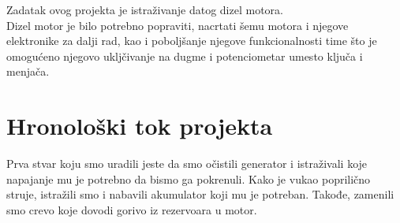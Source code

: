 \documentclass[a4paper, 11pt, titlepage]{article}
\begin{document}
Zadatak ovog projekta je istraživanje datog dizel motora. \\
Dizel motor je bilo potrebno popraviti, nacrtati šemu motora i njegove elektronike za dalji rad, kao i poboljšanje njegove funkcionalnosti time što je omogućeno njegovo ukljčivanje na dugme i potenciometar umesto ključa i menjača.



\newpage
\section{Hronološki tok projekta}

Prva stvar koju smo uradili jeste da smo očistili generator i istraživali koje napajanje mu je potrebno da bismo ga pokrenuli. 
Kako je vukao poprilično struje, istražili smo i nabavili akumulator koji mu je potreban. Takođe, zamenili smo crevo koje dovodi gorivo iz rezervoara u motor. \\
\end{document}
